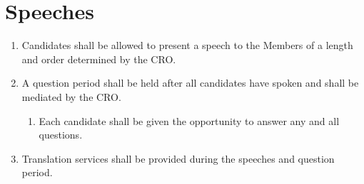 \section{Speeches}
\label{speeches}

\begin{enumerate}
 \item Candidates shall be allowed to present a speech to the Members of a length and order determined by the CRO.
 \item A question period shall be held after all candidates have spoken and shall be mediated by the CRO.
  \begin{enumerate}
   \item Each candidate shall be given the opportunity to answer any and all questions.
  \end{enumerate}
 \item Translation services shall be provided during the speeches and question period.
\end{enumerate}
